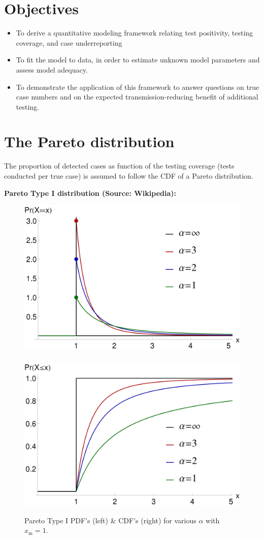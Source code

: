 \documentclass[
]{article}
\begin{document}
\hypertarget{objectives}{%
\section{Objectives}\label{objectives}}

\begin{itemize}
\item
  To derive a quantitative modeling framework relating test positivity,
  testing coverage, and case underreporting
\item
  To fit the model to data, in order to estimate unknown model
  parameters and assess model adequacy.
\item
  To demonstrate the application of this framework to answer questions
  on true case numbers and on the expected transmission-reducing benefit
  of additional testing.
\end{itemize}

\newpage

\hypertarget{the-pareto-distribution}{%
\section{The Pareto distribution}\label{the-pareto-distribution}}

The proportion of detected cases as function of the testing coverage
(tests conducted per true case) is assumed to follow the CDF of a Pareto
distribution.

\textbf{Pareto Type I distribution (Source: Wikipedia):}

\begin{center}
\begin{figure}[H]
  \includegraphics[width=0.4\columnwidth]{Probability_density_function_of_Pareto_distribution.png} ~~
  \includegraphics[width=0.4\columnwidth]{Cumulative_distribution_function_of_Pareto_distribution.png}
  \caption{Pareto Type I PDF's (left) \& CDF's (right) for various $\alpha$  with ${\displaystyle x_{\mathrm {m} }=1.}$}
\end{figure}
\end{center}
\end{document}
